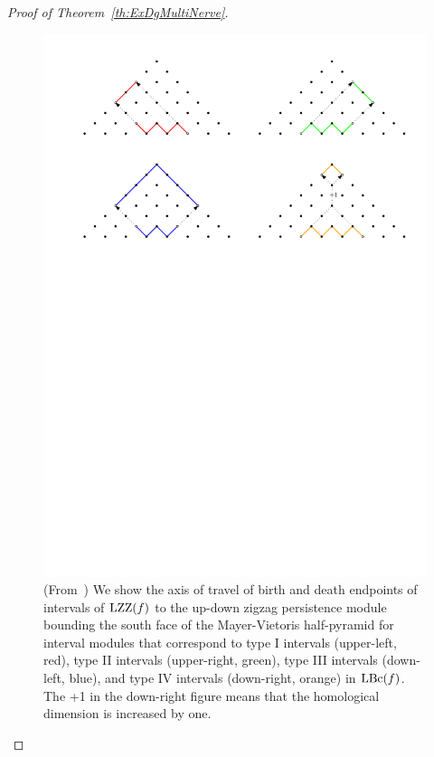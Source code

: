 \begin{proof}[Proof of Theorem~\ref{th:ExDgMultiNerve}]
\begin{figure}[h]\centering
\includegraphics[width=15cm]{figures/ZZShift}
\caption[Pyramid rules]{\label{fig:shiftZZ} (From~\cite{Carlsson09b}) We show the
  axis of travel of birth and death endpoints of intervals of
  $\mathrm{LZZ}(f)$ to the up-down zigzag persistence module bounding the south face of
  the Mayer-Vietoris half-pyramid for interval modules that correspond
  to type I intervals (upper-left, red), type II intervals
  (upper-right, green), type III intervals (down-left, blue), and type IV
  intervals (down-right, orange) in $\mathrm{LBc}(f)$. The +1 in the
  down-right figure means that the homological dimension is increased
  by one.}
\end{figure}


\end{proof}
